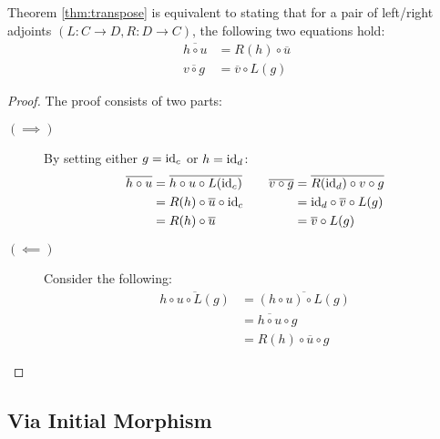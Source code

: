 \begin{theorem}
  Theorem \ref{thm:transpose} is equivalent to stating that for a pair of
  left/right adjoints $(L:C\to D, R:D\to C)$, the following two equations hold:
  \begin{align*}
    \overline{h\circ u} &= R(h) \circ \overline{u}\\
    \overline{v\circ g} &= \overline{v} \circ L(g)
  \end{align*}

  \begin{proof}
    The proof consists of two parts:
    \begin{description}
      \item[$(\implies)$] By setting either $g=\mathrm{id}_c$ or $h=\mathrm{id}_d$:
        \[
          \begin{aligned}
            \overline{h\circ u}
              &= \overline{h\circ u \circ L(\mathrm{id}_c)}\\
              &= R(h) \circ \overline{u} \circ \mathrm{id}_c\\
              &= R(h) \circ \overline{u}
          \end{aligned}
          \qquad
          \begin{aligned}
            \overline{v\circ g}
              &= \overline{R(\mathrm{id}_d)\circ v\circ g}\\
              &= \mathrm{id}_d \circ \overline{v} \circ L(g)\\
              &= \overline{v} \circ L(g)
          \end{aligned}
        \]
      \item[$(\impliedby)$] Consider the following:
        \[
          \begin{aligned}
            \overline{h \circ u\circ L(g)}
              &= \overline{(h \circ u)\circ L(g)}\\
              &= \overline{h\circ u} \circ g\\
              &= R(h) \circ \overline{u} \circ g
          \end{aligned}
        \]
    \end{description}
  \end{proof}
\end{theorem}

\subsection{Via Initial Morphism}


